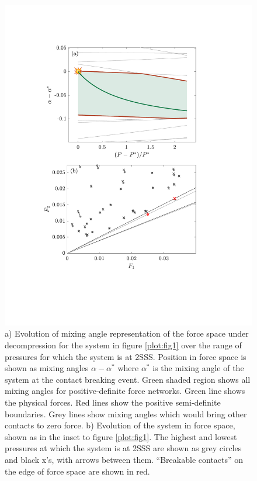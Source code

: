 \begin{figure}[th!]
\includegraphics[width=0.75\columnwidth, trim=98 140 139 101, clip]{contactBreakingPaper/combinedTrajectoryComparison.pdf}
\caption{a) Evolution of mixing angle representation of the force space under decompression for the system in figure \ref{plot:fig1} over the range of pressures for which the system is at 2SSS. Position in force space is shown as mixing angles $\alpha-\alpha^*$ where $\alpha^*$ is the mixing angle of the system at the contact breaking event. Green shaded region shows all mixing angles for positive-definite force networks.  Green line shows the physical forces.  Red lines show the positive semi-definite boundaries.  Grey lines show mixing angles which would bring other contacts to zero force.
b) Evolution of the system in force space, shown as in the inset to figure \ref{plot:fig1}. The highest and lowest pressures at which the system is at 2SSS are shown as grey circles and black x's, with arrows between them. ``Breakable contacts'' on the edge of force space are shown in red.}
\label{plot:trajectory}
\end{figure}


